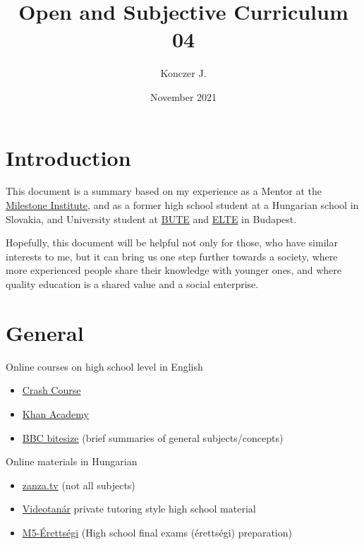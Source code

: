\documentclass{article}
\title{Open and Subjective Curriculum \\ 04}
\author{Konczer J.}
\date{November 2021}
\begin{document}
\maketitle

\section*{}

\section{Introduction}

This document is a summary based on my experience as a Mentor at the \href{https://milestone-institute.org/}{Milestone Institute}, and as a former high school student at a Hungarian school in Slovakia, and University student at \href{https://www.bme.hu/?language=en}{BUTE} and \href{https://www.elte.hu/en/}{ELTE} in Budapest.

Hopefully, this document will be helpful not only for those, who have similar interests to me, but it can bring us one step further towards a society, where more experienced people share their knowledge with younger ones, and where quality education is a shared value and a social enterprise.


\section{General}

Online courses on high school level in English
\begin{itemize}
\item \href{https://thecrashcourse.com/}{Crash Course}
\item \href{https://www.khanacademy.org/}{Khan Academy}
\item \href{https://www.bbc.co.uk/bitesize/levels/z98jmp3}{BBC bitesize} (brief summaries of general subjects/concepts)
\end{itemize}
Online materials in Hungarian
\begin{itemize}
    \item \href{https://zanza.tv/}{zanza.tv} (not all subjects)
    \item \href{https://www.youtube.com/user/videotanar/}{Videotanár} private tutoring style high school material
    \item \href{https://www.youtube.com/playlist?list=PLEiwVd6n_Q_38BxQQDqYZE6bdMQAZxbX2}{M5-Érettségi} (High school final exams (érettségi) preparation)
\end{itemize}
\end{document}
